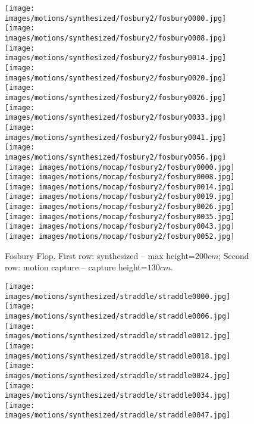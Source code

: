 \begin{figure*}
    \centering
    \begin{subfigure}[b]{\textwidth}
    \texttt{[image: images/motions/synthesized/fosbury2/fosbury0000.jpg]}
    \texttt{[image: images/motions/synthesized/fosbury2/fosbury0008.jpg]}
    \texttt{[image: images/motions/synthesized/fosbury2/fosbury0014.jpg]}
    \texttt{[image: images/motions/synthesized/fosbury2/fosbury0020.jpg]}
    \texttt{[image: images/motions/synthesized/fosbury2/fosbury0026.jpg]}
    \texttt{[image: images/motions/synthesized/fosbury2/fosbury0033.jpg]}
    \texttt{[image: images/motions/synthesized/fosbury2/fosbury0041.jpg]}
    \texttt{[image: images/motions/synthesized/fosbury2/fosbury0056.jpg]} \\
    \texttt{[image: images/motions/mocap/fosbury2/fosbury0000.jpg]}
    \texttt{[image: images/motions/mocap/fosbury2/fosbury0008.jpg]}
    \texttt{[image: images/motions/mocap/fosbury2/fosbury0014.jpg]}
    \texttt{[image: images/motions/mocap/fosbury2/fosbury0019.jpg]}
    \texttt{[image: images/motions/mocap/fosbury2/fosbury0026.jpg]}
    \texttt{[image: images/motions/mocap/fosbury2/fosbury0035.jpg]}
    \texttt{[image: images/motions/mocap/fosbury2/fosbury0043.jpg]}
    \texttt{[image: images/motions/mocap/fosbury2/fosbury0052.jpg]}
    \caption{Fosbury Flop. First row: synthesized -- max height=$200cm$; Second row: motion capture -- capture height=$130cm$.}
    \end{subfigure}
    \begin{subfigure}[b]{\textwidth}
    \texttt{[image: images/motions/synthesized/straddle/straddle0000.jpg]}
    \texttt{[image: images/motions/synthesized/straddle/straddle0006.jpg]}
    \texttt{[image: images/motions/synthesized/straddle/straddle0012.jpg]}
    \texttt{[image: images/motions/synthesized/straddle/straddle0018.jpg]}
    \texttt{[image: images/motions/synthesized/straddle/straddle0024.jpg]}
    \texttt{[image: images/motions/synthesized/straddle/straddle0034.jpg]}
    \texttt{[image: images/motions/synthesized/straddle/straddle0047.jpg]}

\end{subfigure}
\end{figure*}
